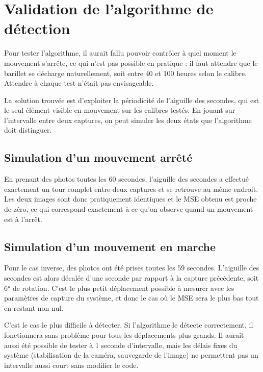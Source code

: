 
\section{Validation de l'algorithme de détection}
\label{sec:valid-detection}

Pour tester l'algorithme, il aurait fallu pouvoir contrôler à quel moment le mouvement s'arrête, ce qui n'est pas possible en pratique : il faut attendre que le barillet se décharge naturellement, soit entre 40 et 100 heures selon le calibre. Attendre à chaque test n'était pas envisageable.

La solution trouvée est d'exploiter la périodicité de l'aiguille des secondes, qui est le seul élément visible en mouvement sur les calibres testés. En jouant sur l'intervalle entre deux captures, on peut simuler les deux états que l'algorithme doit distinguer.

\subsection*{Simulation d'un mouvement arrêté}

En prenant des photos toutes les 60 secondes, l'aiguille des secondes a effectué exactement un tour complet entre deux captures et se retrouve au même endroit. Les deux images sont donc pratiquement identiques et le MSE obtenu est proche de zéro, ce qui correspond exactement à ce qu'on observe quand un mouvement est à l'arrêt.

\subsection*{Simulation d'un mouvement en marche}

Pour le cas inverse, des photos ont été prises toutes les 59 secondes. L'aiguille des secondes est alors décalée d'une seconde par rapport à la capture précédente, soit 6° de rotation. C'est le plus petit déplacement possible à mesurer avec les paramètres de capture du système, et donc le cas où le MSE sera le plus bas tout en restant non nul.

C'est le cas le plus difficile à détecter. Si l'algorithme le détecte correctement, il fonctionnera sans problème pour tous les déplacements plus grands. Il aurait aussi été possible de tester à 1 seconde d'intervalle, mais les délais fixes du système (stabilisation de la caméra, sauvegarde de l'image) ne permettent pas un intervalle aussi court sans modifier le code.

